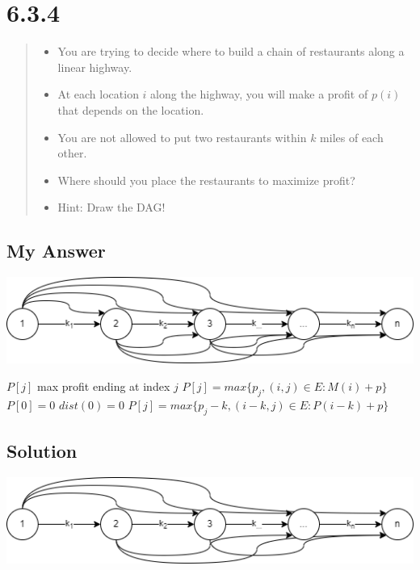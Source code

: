 \documentclass[12pt, letterpaper, twoside]{article}
\begin{document}
\section*{6.3.4}
\begin{quote}
  \begin{itemize}
    \item You are trying to decide where to build a chain of restaurants along a linear highway.
    \item At each location $i$ along the highway, you will make a profit of $p(i)$ that depends on the location.
    \item You are not allowed to put two restaurants within $k$ miles of each other.
    \item Where should you place the restaurants to maximize profit?
    \item Hint: Draw the DAG!
  \end{itemize}
\end{quote}
\subsection*{My Answer}
\begin{center}
  \includegraphics[scale=0.6]{6_3_4.png}
\end{center}
\begin{algorithmic}
  \State $P[j]$ max profit ending at index $j$
  \State $P[j]=max\{p_j,(i,j)\in{E}:M(i)+p\}$
  \State $P[0]=0$
  \State $dist(0)=0$
  \State $P[j]=max\{p_j-k,(i-k,j)\in{E}:P(i-k)+p\}$
  \EndFor
\end{algorithmic}

\subsection*{Solution}
\begin{center}
  \includegraphics[scale=0.6]{6_3_4_solution.png}
\end{center}
\newpage
\end{document}
